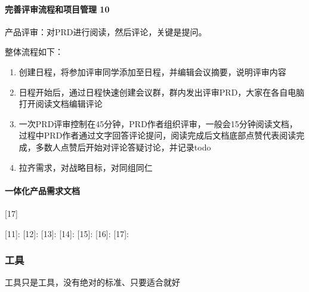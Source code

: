 \documentclass[letterpaper,10pt,english]{sphinxmanual}
\begin{document}
\paragraph{完善评审流程和项目管理 10\sphinxfootnotemark[575]}
\label{\detokenize{chapter_knowledge/PRD:id29}}%
\begin{footnotetext}[575]\sphinxAtStartFootnote
{}
%
\end{footnotetext}\ignorespaces 
产品评审：对PRD进行阅读，然后评论，关键是提问。

整体流程如下：
\begin{enumerate}
%
\item {} 
创建日程，将参加评审同学添加至日程，并编辑会议摘要，说明评审内容

\item {} 
日程开始后，通过日程快速创建会议群，群内发出评审PRD，大家在各自电脑打开阅读文档编辑评论

\item {} 
一次PRD评审控制在45分钟，PRD作者组织评审，一般会15分钟阅读文档，过程中PRD作者通过文字回答评论提问，阅读完成后文档底部点赞代表阅读完成，多数人点赞后开始对评论答疑讨论，并记录todo

\item {} 
拉齐需求，对战略目标，对同组同仁

\end{enumerate}


\paragraph{一体化产品需求文档}
\label{\detokenize{chapter_knowledge/PRD:id30}}
{[}17{]}

{[}11{]}: {[}12{]}:  {[}13{]}:
 {[}14{]}:
 {[}15{]}:
 {[}16{]}:
 {[}17{]}:


\subsubsection{工具}
\label{\detokenize{chapter_knowledge/tools:id1}}\label{\detokenize{chapter_knowledge/tools::doc}}
工具只是工具，没有绝对的标准、只要适合就好
\end{document}
